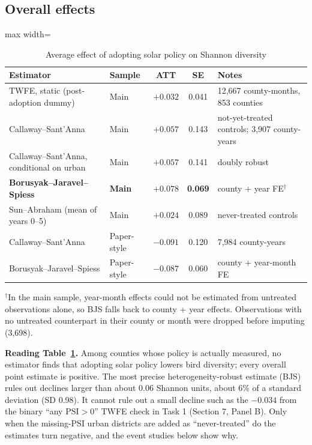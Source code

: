 \documentclass[11pt]{article}
\begin{document}
\subsection{Overall effects}
\begin{table}[H]\centering\small
\caption{Average effect of adopting solar policy on Shannon diversity}\label{tab:att}
\begin{adjustbox}{max width=\linewidth}
\begin{tabular}{llccl}
\toprule
Estimator & Sample & ATT & SE & Notes\\
\midrule
TWFE, static (post-adoption dummy) & Main & $+0.032$ & 0.041 & 12,667 county-months, 853 counties\\
Callaway--Sant'Anna & Main & $+0.057$ & 0.143 & not-yet-treated controls; 3,907 county-years\\
Callaway--Sant'Anna, conditional on urban & Main & $+0.057$ & 0.141 & doubly robust\\
\textbf{Borusyak--Jaravel--Spiess} & \textbf{Main} & $\mathbf{+0.078}$ & \textbf{0.069} & county + year FE$^\dagger$\\
Sun--Abraham (mean of years 0--5) & Main & $+0.024$ & 0.089 & never-treated controls\\
\midrule
Callaway--Sant'Anna & Paper-style & $-0.091$ & 0.120 & 7,984 county-years\\
Borusyak--Jaravel--Spiess & Paper-style & $-0.087$ & 0.060 & county + year-month FE\\
\bottomrule
\end{tabular}
\end{adjustbox}
\par\smallskip\footnotesize $^\dagger$In the main sample, year-month effects could not be estimated from untreated observations alone, so BJS falls back to county + year effects. Observations with no untreated counterpart in their county or month were dropped before imputing (3,698).
\end{table}

\begin{whybox}\small
\textbf{Reading Table~\ref{tab:att}.} Among counties whose policy is actually measured, no estimator finds that adopting solar policy lowers bird diversity; every overall point estimate is positive. The most precise heterogeneity-robust estimate (BJS) rules out declines larger than about 0.06 Shannon units, about 6\% of a standard deviation (SD 0.98). It cannot rule out a small decline such as the $-0.034$ from the binary ``any PSI$>$0'' TWFE check in Task 1 (Section 7, Panel B). Only when the missing-PSI urban districts are added as ``never-treated'' do the estimates turn negative, and the event studies below show why.
\end{whybox}
\end{document}
